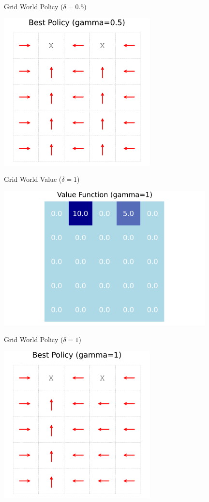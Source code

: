 \documentclass{beamer}
\begin{document}
\begin{frame}{Grid World Policy ($\delta = 0.5$)}
\begin{center}
	\includegraphics[width=8cm]{grid_world_policy_05.png}
\end{center}
\end{frame}

\begin{frame}{Grid World Value ($\delta = 1$)}
\begin{center}
	\includegraphics[width=11cm]{grid_world_value_1.png}
	\end{center}
\end{frame}
\begin{frame}{Grid World Policy ($\delta = 1$)}
\begin{center}
	\includegraphics[width=8cm]{grid_world_policy_1.png}
\end{center}
\end{frame}
\end{document}
